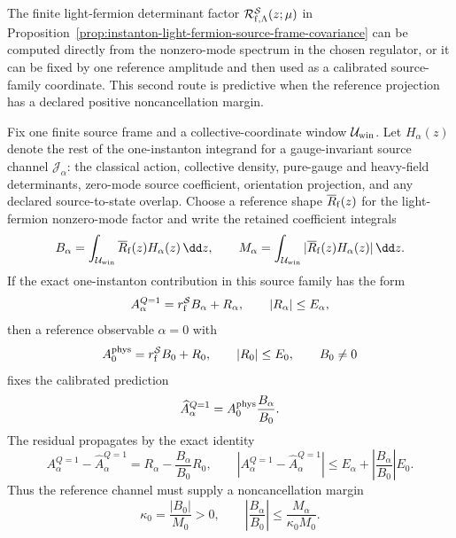\begin{controlledapproximation}
\label{ca:instanton-light-fermion-reference-calibration}
The finite light-fermion determinant factor
\(\mathcal R_{{\rm f},\Lambda}^{\mathcal S}(z;\mu)\) in
Proposition~\ref{prop:instanton-light-fermion-source-frame-covariance} can be
computed directly from the nonzero-mode spectrum in the chosen regulator, or it
can be fixed by one reference amplitude and then used as a calibrated
source-family coordinate.  This second route is predictive when the reference
projection has a declared positive noncancellation margin.

Fix one finite source frame and a collective-coordinate window
\(\mathcal U_{\rm win}\).  Let \(H_\alpha(z)\) denote the rest of the
one-instanton integrand for a gauge-invariant source channel
\(\mathcal J_\alpha\): the classical action, collective density, pure-gauge and
heavy-field determinants, zero-mode source coefficient, orientation projection,
and any declared source-to-state overlap.  Choose a reference shape
\(\overline R_{\rm f}(z)\) for the light-fermion nonzero-mode factor and write
the retained coefficient integrals
\begin{equation}
  B_\alpha
  =
  \int_{\mathcal U_{\rm win}}
    \overline R_{\rm f}(z)H_\alpha(z)\,\dd z,
  \qquad
  M_\alpha
  =
  \int_{\mathcal U_{\rm win}}
    |\overline R_{\rm f}(z)H_\alpha(z)|\,\dd z .
  \label{eq:instanton-reference-determinant-basis-integrals}
\end{equation}
If the exact one-instanton contribution in this source family has the form
\begin{equation}
  A_\alpha^{Q=1}
  =
  r_{\rm f}^{\mathcal S}B_\alpha+R_\alpha,
  \qquad
  |R_\alpha|\le E_\alpha ,
  \label{eq:instanton-reference-calibrated-family}
\end{equation}
then a reference observable \(\alpha=0\) with
\begin{equation}
  A_0^{\rm phys}
  =
  r_{\rm f}^{\mathcal S}B_0+R_0,
  \qquad
  |R_0|\le E_0,\qquad B_0\ne0
  \label{eq:instanton-reference-amplitude-input}
\end{equation}
fixes the calibrated prediction
\begin{equation}
  \widehat A_\alpha^{Q=1}
  =
  A_0^{\rm phys}\frac{B_\alpha}{B_0}.
  \label{eq:instanton-reference-amplitude-prediction}
\end{equation}
The residual propagates by the exact identity
\begin{equation}
  A_\alpha^{Q=1}-\widehat A_\alpha^{Q=1}
  =
  R_\alpha-\frac{B_\alpha}{B_0}R_0,
  \qquad
  \left|A_\alpha^{Q=1}-\widehat A_\alpha^{Q=1}\right|
  \le
  E_\alpha+\left|\frac{B_\alpha}{B_0}\right|E_0 .
  \label{eq:instanton-reference-calibration-error}
\end{equation}
Thus the reference channel must supply a noncancellation margin
\begin{equation}
  \kappa_0=\frac{|B_0|}{M_0}>0,
  \qquad
  \left|\frac{B_\alpha}{B_0}\right|
  \le
  \frac{M_\alpha}{\kappa_0 M_0}.
  \label{eq:instanton-reference-noncancellation-margin}
\end{equation}


\end{controlledapproximation}
